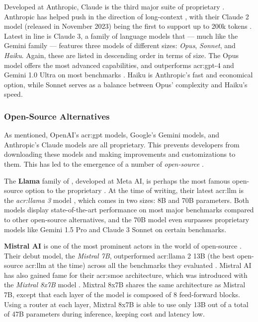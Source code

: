 Developed at Anthropic, Claude is the third major suite of proprietary . Anthropic has helped push in the direction of long-context , with their Claude 2 model (released in November 2023) being the first to support up to 200k tokens \citep[9]{anthropicModelCardEvaluations2023}. Latest in line is Claude 3, a family of language models that --- much like the Gemini family --- features three models of different sizes: \textit{Opus}, \textit{Sonnet}, and \textit{Haiku}. Again, these are listed in descending order in terms of size. The Opus model offers the most advanced capabilities, and outperforms \acrshort{acr:gpt}-4 and Gemini 1.0 Ultra on most benchmarks \citep[6]{anthropicClaudeModelFamily2024}. Haiku is Anthropic's fast and economical option, while Sonnet serves as a balance between Opus' complexity and Haiku's speed.

\subsubsection{Open-Source Alternatives}
\label{subsubsec:open-source-llms}

As mentioned, OpenAI's \acrshort{acr:gpt} models, Google's Gemini models, and Anthropic's Claude models are all proprietary. This prevents developers from downloading these models and making improvements and customizations to them. This has led to the emergence of a number of \textit{open-source} .

The \textbf{Llama} family of , developed at Meta AI, is perhaps the most famous open-source option to the proprietary . At the time of writing, their latest \acrshort{acr:llm} is the \textit{\acrshort{acr:llama} 3} model \citep{metaaiIntroducingMetaLlama2024}, which comes in two sizes: 8B and 70B parameters. Both models display state-of-the-art performance on most major benchmarks compared to other open-source alternatives, and the 70B model even surpasses proprietary models like Gemini 1.5 Pro and Claude 3 Sonnet on certain benchmarks.

\textbf{Mistral AI} is one of the most prominent actors in the world of open-source . Their debut model, the \textit{Mistral 7B}, outperformed \acrshort{acr:llama} 2 13B (the best open-source \acrshort{acr:llm} at the time) across all the benchmarks they evaluated \citep{jiangMistral7B2023}. Mistral AI has also gained fame for their \gls{acr:smoe} architecture, which was introduced with the \textit{Mixtral 8x7B} model \citep{jiangMixtralExperts2024}. Mixtral 8x7B shares the same architecture as Mistral 7B, except that each layer of the model is composed of 8 feed-forward blocks. Using a router at each layer, Mixtral 8x7B is able to use only 13B out of a total of 47B parameters during inference, keeping cost and latency low.

